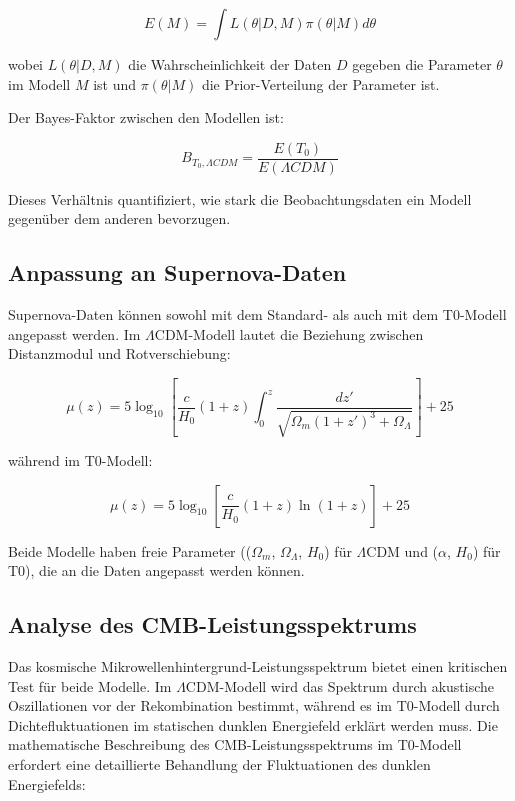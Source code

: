 \documentclass[a4paper,12pt]{article}
\theoremstyle{definition}
\theoremstyle{remark}
\begin{document}
	\begin{equation}
		E(M) = \int L(\theta|D,M) \pi(\theta|M) d\theta
	\end{equation}
	
	wobei $L(\theta|D,M)$ die Wahrscheinlichkeit der Daten $D$ gegeben die Parameter $\theta$ im Modell $M$ ist und $\pi(\theta|M)$ die Prior-Verteilung der Parameter ist.
	
	Der Bayes-Faktor zwischen den Modellen ist:
	
	\begin{equation}
		B_{T_0,\Lambda CDM} = \frac{E(T_0)}{E(\Lambda CDM)}
	\end{equation}
	
	Dieses Verhältnis quantifiziert, wie stark die Beobachtungsdaten ein Modell gegenüber dem anderen bevorzugen.
	
	\subsection{Anpassung an Supernova-Daten}
	Supernova-Daten können sowohl mit dem Standard- als auch mit dem T0-Modell angepasst werden. Im $\Lambda$CDM-Modell lautet die Beziehung zwischen Distanzmodul und Rotverschiebung:
	
	\begin{equation}
		\mu(z) = 5 \log_{10}\left[\frac{c}{H_0}(1+z)\int_0^z \frac{dz'}{\sqrt{\Omega_m(1+z')^3 + \Omega_{\Lambda}}}\right] + 25
	\end{equation}
	
	während im T0-Modell:
	
	\begin{equation}
		\mu(z) = 5 \log_{10}\left[\frac{c}{H_0}(1+z)\ln(1+z)\right] + 25
	\end{equation}
	
	Beide Modelle haben freie Parameter (($\Omega_m$, $\Omega_{\Lambda}$, $H_0$) für $\Lambda$CDM und ($\alpha$, $H_0$) für T0), die an die Daten angepasst werden können.
	
	\subsection{Analyse des CMB-Leistungsspektrums}
	Das kosmische Mikrowellenhintergrund-Leistungsspektrum bietet einen kritischen Test für beide Modelle. Im $\Lambda$CDM-Modell wird das Spektrum durch akustische Oszillationen vor der Rekombination bestimmt, während es im T0-Modell durch Dichtefluktuationen im statischen dunklen Energiefeld erklärt werden muss. Die mathematische Beschreibung des CMB-Leistungsspektrums im T0-Modell erfordert eine detaillierte Behandlung der Fluktuationen des dunklen Energiefelds:
	
\end{document}
